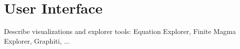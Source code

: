 \section{User Interface}

Describe visualizations and explorer tools: Equation Explorer, Finite Magma Explorer, Graphiti, ...
